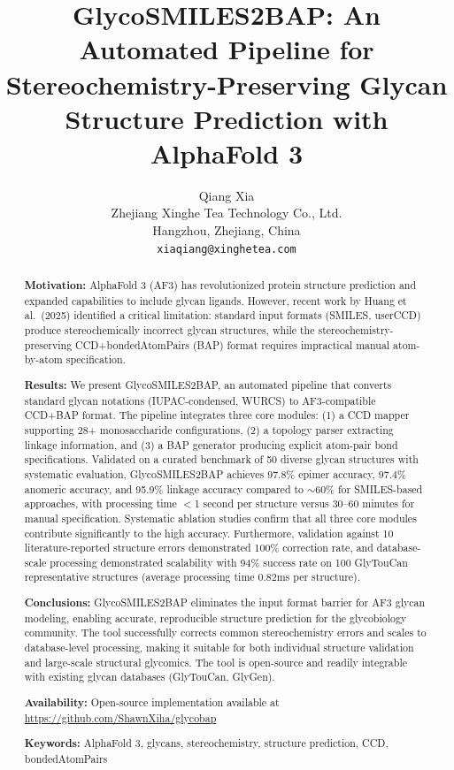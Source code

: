 \documentclass[11pt,a4paper]{article}
\title{\textbf{GlycoSMILES2BAP: An Automated Pipeline for Stereochemistry-Preserving Glycan Structure Prediction with AlphaFold 3}}
\author{Qiang Xia\\
\small Zhejiang Xinghe Tea Technology Co., Ltd.\\
\small Hangzhou, Zhejiang, China\\
\small \texttt{xiaqiang@xinghetea.com}}
\date{}
\begin{document}
\maketitle

\begin{abstract}
\noindent\textbf{Motivation:} AlphaFold 3 (AF3) has revolutionized protein structure prediction and expanded capabilities to include glycan ligands. However, recent work by Huang et al.\ (2025) identified a critical limitation: standard input formats (SMILES, userCCD) produce stereochemically incorrect glycan structures, while the stereochemistry-preserving CCD+bondedAtomPairs (BAP) format requires impractical manual atom-by-atom specification.

\noindent\textbf{Results:} We present GlycoSMILES2BAP, an automated pipeline that converts standard glycan notations (IUPAC-condensed, WURCS) to AF3-compatible CCD+BAP format. The pipeline integrates three core modules: (1) a CCD mapper supporting 28+ monosaccharide configurations, (2) a topology parser extracting linkage information, and (3) a BAP generator producing explicit atom-pair bond specifications. Validated on a curated benchmark of 50 diverse glycan structures with systematic evaluation, GlycoSMILES2BAP achieves 97.8\% epimer accuracy, 97.4\% anomeric accuracy, and 95.9\% linkage accuracy compared to ${\sim}60$\% for SMILES-based approaches, with processing time $<$1 second per structure versus 30--60 minutes for manual specification. Systematic ablation studies confirm that all three core modules contribute significantly to the high accuracy. Furthermore, validation against 10 literature-reported structure errors demonstrated 100\% correction rate, and database-scale processing demonstrated scalability with 94\% success rate on 100 GlyTouCan representative structures (average processing time 0.82ms per structure).

\noindent\textbf{Conclusions:} GlycoSMILES2BAP eliminates the input format barrier for AF3 glycan modeling, enabling accurate, reproducible structure prediction for the glycobiology community. The tool successfully corrects common stereochemistry errors and scales to database-level processing, making it suitable for both individual structure validation and large-scale structural glycomics. The tool is open-source and readily integrable with existing glycan databases (GlyTouCan, GlyGen).

\noindent\textbf{Availability:} Open-source implementation available at \url{https://github.com/ShawnXiha/glycobap}

\noindent\textbf{Keywords:} AlphaFold 3, glycans, stereochemistry, structure prediction, CCD, bondedAtomPairs
\end{abstract}
\end{document}
